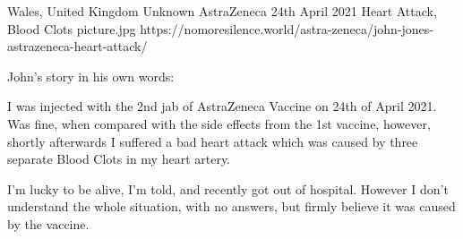 {Wales, United Kingdom}
{Unknown}
{AstraZeneca}
{24th April 2021}
{Heart Attack, Blood Clots}
{picture.jpg}
{https://nomoresilence.world/astra-zeneca/john-jones-astrazeneca-heart-attack/}
{

John’s story in his own words:

I was injected with the 2nd jab of AstraZeneca Vaccine on 24th of April
2021. Was fine, when compared with the side effects from the 1st vaccine,
however, shortly afterwards I suffered a bad heart attack which was caused by
three separate Blood Clots in my heart artery.

I’m lucky to be alive, I’m told, and recently got out of hospital. However I
don’t understand the whole situation, with no answers, but firmly believe it was
caused by the vaccine.

}
